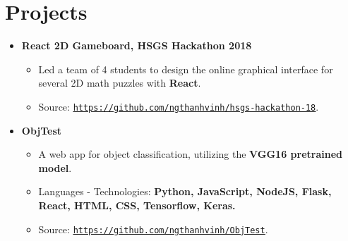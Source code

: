 \documentclass[letterpaper,11pt]{article}
\makeatletter
\newcommand{\resumeItem}[2]{
  \item\small{
    \textbf{#1}{#2 \vspace{-2pt}}
  }
}
\newcommand{\resumeSmallSubheading}[1]{
  \item
    \textbf{#1}\vspace{-5pt}
}
\newcommand{\resumePoint}[2]{
  \item
    \begin{tabular*}{0.97\textwidth}[t]{l@{\extracolsep{\fill}}r}
      #1 & \textbf{\small #2}
    \end{tabular*}
}
\newcommand{\resumeSubHeadingListStart}{\begin{itemize}[leftmargin=*]}
\newcommand{\resumeSubHeadingListEnd}{\end{itemize}}
\newcommand{\resumeItemListStart}{\begin{itemize}}
\newcommand{\resumeItemListEnd}{\end{itemize}\vspace{-5pt}}
\makeatother
\begin{document}
\section{Projects}
  \resumeSubHeadingListStart
    \resumeSmallSubheading{React 2D Gameboard, HSGS Hackathon 2018}
    \resumeItemListStart
      \resumeItem{}
        {Led a team of 4 students to design the online graphical interface for several 2D math puzzles with \textbf{React}.}
      \resumeItem{}
      {Source: \href{https://github.com/ngthanhvinh/hsgs-hackathon-18}{\underline{\texttt{https://github.com/ngthanhvinh/hsgs-hackathon-18}}}.}
    \resumeItemListEnd


    \resumeSmallSubheading{ObjTest}
    \resumeItemListStart
      \resumeItem{}
        {A web app for object classification, utilizing the \textbf{VGG16 pretrained model}.}
      \resumeItem{}
        {Languages - Technologies: \textbf{Python, JavaScript, NodeJS, Flask, React, HTML, CSS, Tensorflow, Keras.}}
      \resumeItem{}
      {Source: \href{https://github.com/ngthanhvinh/ObjTest}{\underline{\texttt{https://github.com/ngthanhvinh/ObjTest}}}.}
    \resumeItemListEnd
  \resumeSubHeadingListEnd




\end{document}
